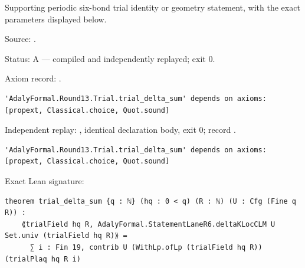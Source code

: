 \begin{theorem}[bp-393]
\label{bp-393}
\leanok
Supporting periodic six-bond trial identity or geometry statement, with the exact parameters displayed below.

\par Source: \texttt{}.
\par Status: A — compiled and independently replayed; exit 0.
\par Axiom record: \texttt{}.
\begin{verbatim}
'AdalyFormal.Round13.Trial.trial_delta_sum' depends on axioms: [propext, Classical.choice, Quot.sound]
\end{verbatim}
\par Independent replay: \texttt{}, identical declaration body, exit 0; record \texttt{}.
\begin{verbatim}
'AdalyFormal.Round13.Trial.trial_delta_sum' depends on axioms: [propext, Classical.choice, Quot.sound]
\end{verbatim}
\par Exact Lean signature:
\begin{verbatim}
theorem trial_delta_sum {q : ℕ} (hq : 0 < q) (R : ℕ) (U : Cfg (Fine q R)) :
    ⟪trialField hq R, AdalyFormal.StatementLaneR6.deltaKLocCLM U Set.univ (trialField hq R)⟫ =
      ∑ i : Fin 19, contrib U (WithLp.ofLp (trialField hq R)) (trialPlaq hq R i)
\end{verbatim}
\end{theorem}

